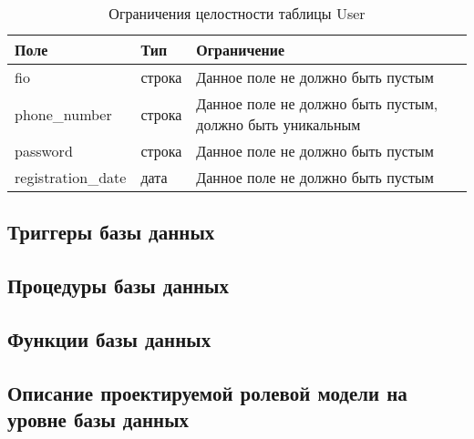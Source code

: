 \begin{table}[ht]
	\begin{center}
		\begin{threeparttable}
			\caption{Ограничения целостности таблицы User}
			\label{tbl:entity_user}
			\begin{tabular}{|p{4cm}|p{2.5cm}|p{8.5cm}|}
				\hline 
				\textbf{Поле} & \textbf{Тип} & \textbf{Ограничение}  \\
				\hline
				fio & строка & Данное поле не должно быть пустым  \\
				\hline
				phone\_number & строка & Данное поле не должно быть пустым, должно быть уникальным  \\
				\hline
				password & строка & Данное поле не должно быть пустым  \\
				\hline
				registration\_date & дата & Данное поле не должно быть пустым  \\
				\hline
			\end{tabular}
		\end{threeparttable}			
	\end{center}
\end{table}


\subsection{Триггеры базы данных}



\subsection{Процедуры базы данных}

\subsection{Функции базы данных}



\subsection{Описание проектируемой ролевой модели на уровне базы данных}

\clearpage

